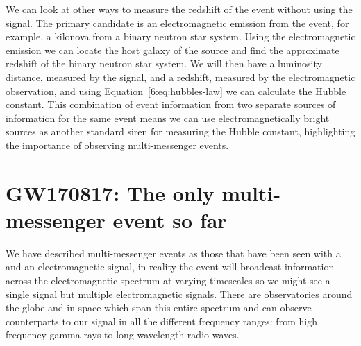 We can look at other ways to measure the redshift of the event without using the \gwadj signal. The primary candidate is an electromagnetic emission from the event, for example, a kilonova from a binary neutron star system. Using the electromagnetic emission we can locate the host galaxy of the source and find the approximate redshift of the binary neutron star system. We will then have a luminosity distance, measured by the \gwadj signal, and a redshift, measured by the electromagnetic observation, and using Equation~\ref{6:eq:hubbles-law} we can calculate the Hubble constant. This combination of event information from two separate sources of information for the same event means we can use electromagnetically bright \gwadj sources as another standard siren for measuring the Hubble constant, highlighting the importance of observing multi-messenger events.

\section{\label{6:sec:gw170817}GW170817: The only multi-messenger event so far}

We have described multi-messenger events as those that have been seen with a \gw and an electromagnetic signal, in reality the event will broadcast information across the electromagnetic spectrum at varying timescales so we might see a single \gwadj signal but multiple electromagnetic signals. There are observatories around the globe and in space which span this entire spectrum and can observe counterparts to our \gwadj signal in all the different frequency ranges: from high frequency gamma rays to long wavelength radio waves. 

